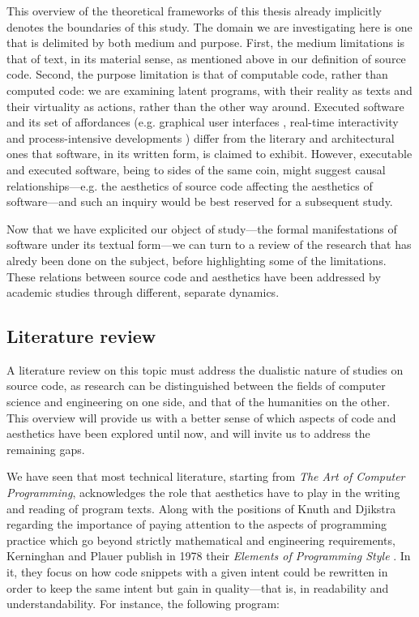 This overview of the theoretical frameworks of this thesis already implicitly denotes the boundaries of this study. The domain we are investigating here is one that is delimited by both medium and purpose. First, the medium limitations is that of text, in its material sense, as mentioned above in our definition of source code. Second, the purpose limitation is that of computable code, rather than computed code: we are examining latent programs, with their reality as texts and their virtuality as actions, rather than the other way around. Executed software and its set of affordances (e.g. graphical user interfaces \citep{gelernter_machine_1998}, real-time interactivity \citep{laurel_computers_1993} and process-intensive developments \citep{murray_hamlet_1998}) differ from the literary and architectural ones that software, in its written form, is claimed to exhibit. However, executable and executed software, being to sides of the same coin, might suggest causal relationships—e.g. the aesthetics of source code affecting the aesthetics of software—and such an inquiry would be best reserved for a subsequent study.

Now that we have explicited our object of study—the formal manifestations of software under its textual form—we can turn to a review of the research that has alredy been done on the subject, before highlighting some of the limitations. These relations between source code and aesthetics have been addressed by academic studies through different, separate dynamics.

\subsection{Literature review}
\label{subsec:literature-review}

A literature review on this topic must address the dualistic nature of studies on source code, as research can be distinguished between the fields of computer science and engineering on one side, and that of the humanities on the other. This overview will provide us with a better sense of which aspects of code and aesthetics have been explored until now, and will invite us to address the remaining gaps.

We have seen that most technical literature, starting from \emph{The Art of Computer Programming}, acknowledges the role that aesthetics have to play in the writing and reading of program texts. Along with the positions of Knuth and Djikstra regarding the importance of paying attention to the aspects of programming practice \citep{dijkstra_chapter_1972} which go beyond strictly mathematical and engineering requirements, Kerninghan and Plauer publish in 1978 their \emph{Elements of Programming Style} \citep{kernighan_elements_1978}. In it, they focus on how code snippets with a given intent could be rewritten in order to keep the same intent but gain in quality—that is, in readability and understandability. For instance, the following program:

